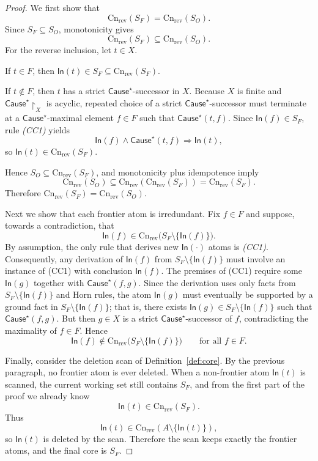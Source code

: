 \documentclass[twoside]{article}
\newcommand{\Cn}{\mathrm{Cn}}
\newcommand{\1}{\mathbf{1}}
\begin{document}
\begin{proof}
We first show that
\[
\Cn_{\mathrm{rev}}(S_F)=\Cn_{\mathrm{rev}}(S_O).
\]
Since \(S_F\subseteq S_O\), monotonicity gives
\[
\Cn_{\mathrm{rev}}(S_F)\subseteq \Cn_{\mathrm{rev}}(S_O).
\]
For the reverse inclusion, let \(t\in X\).

If \(t\in F\), then \(\mathsf{In}(t)\in S_F\subseteq \Cn_{\mathrm{rev}}(S_F)\).

If \(t\notin F\), then \(t\) has a strict \(\mathsf{Cause}^\star\)-successor in \(X\).
Because \(X\) is finite and \(\mathsf{Cause}^\star\!\upharpoonright_X\) is acyclic, repeated choice of a strict
\(\mathsf{Cause}^\star\)-successor must terminate at a \(\mathsf{Cause}^\star\)-maximal element \(f\in F\) such that
\(\mathsf{Cause}^\star(t,f)\).
Since \(\mathsf{In}(f)\in S_F\), rule \emph{(CC1)} yields
\[
\mathsf{In}(f)\wedge \mathsf{Cause}^\star(t,f)\Rightarrow \mathsf{In}(t),
\]
so \(\mathsf{In}(t)\in \Cn_{\mathrm{rev}}(S_F)\).

Hence \(S_O\subseteq \Cn_{\mathrm{rev}}(S_F)\), and monotonicity plus idempotence imply
\[
\Cn_{\mathrm{rev}}(S_O)\subseteq \Cn_{\mathrm{rev}}(\Cn_{\mathrm{rev}}(S_F))=\Cn_{\mathrm{rev}}(S_F).
\]
Therefore \(\Cn_{\mathrm{rev}}(S_F)=\Cn_{\mathrm{rev}}(S_O)\).

Next we show that each frontier atom is irredundant.
Fix \(f\in F\) and suppose, towards a contradiction, that
\[
\mathsf{In}(f)\in \Cn_{\mathrm{rev}}\bigl(S_F\setminus\{\mathsf{In}(f)\}\bigr).
\]
By assumption, the only rule that derives new \(\mathsf{In}(\cdot)\) atoms is \emph{(CC1)}.
Consequently, any derivation of \(\mathsf{In}(f)\) from \(S_F\setminus\{\mathsf{In}(f)\}\) must
involve an instance of (CC1) with conclusion \(\mathsf{In}(f)\).  The premises of (CC1) require
some \(\mathsf{In}(g)\) together with \(\mathsf{Cause}^\star(f,g)\).  Since the derivation
uses only facts from \(S_F\setminus\{\mathsf{In}(f)\}\) and Horn rules, the atom
\(\mathsf{In}(g)\) must eventually be supported by a ground fact in
\(S_F\setminus\{\mathsf{In}(f)\}\); that is, there exists
\(\mathsf{In}(g)\in S_F\setminus\{\mathsf{In}(f)\}\) such that
\(\mathsf{Cause}^\star(f,g)\).  But then \(g\in X\) is a strict
\(\mathsf{Cause}^\star\)-successor of \(f\), contradicting the maximality of \(f\in F\).
Hence
\[
\mathsf{In}(f)\notin \Cn_{\mathrm{rev}}\bigl(S_F\setminus\{\mathsf{In}(f)\}\bigr)
\qquad\text{for all } f\in F.
\]

Finally, consider the deletion scan of Definition~\ref{def:core}.
By the previous paragraph, no frontier atom is ever deleted.
When a non-frontier atom \(\mathsf{In}(t)\) is scanned, the current working set still contains \(S_F\), and from the first part
of the proof we already know
\[
\mathsf{In}(t)\in \Cn_{\mathrm{rev}}(S_F).
\]
Thus
\[
\mathsf{In}(t)\in \Cn_{\mathrm{rev}}(A\setminus\{\mathsf{In}(t)\}),
\]
so \(\mathsf{In}(t)\) is deleted by the scan.
Therefore the scan keeps exactly the frontier atoms, and the final core is \(S_F\).
\end{proof}
\end{document}
